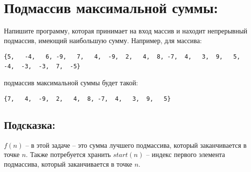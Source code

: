 \documentclass{article}
\begin{document}
\section*{Подмассив максимальной суммы:}
Напишите программу, которая принимает на вход массив и находит непрерывный подмассив, имеющий наибольшую сумму. Например, для массива:
\begin{verbatim}
{5,   -4,   6, -9,   7,   4,  -9,  2,   4,  8, -7,  4,   3,  9,   5,  -4,  -3,  -3,  7,  -5}
\end{verbatim}
подмассив максимальной суммы будет такой:
\begin{verbatim}
{7,   4,  -9,  2,   4,  8, -7,  4,   3,  9,   5}
\end{verbatim}
\subsection*{Подсказка:}
$f(n)$ -- в этой задаче -- это сумма лучшего подмассива, который заканчивается в точке $n$. Также потребуется хранить $start(n)$ -- индекс первого элемента подмассива, который заканчивается в точке $n$.
\end{document}
